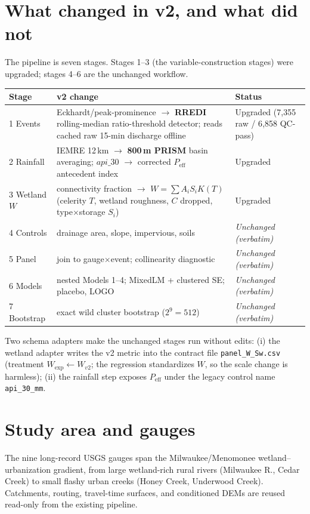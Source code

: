 \documentclass[11pt]{article}
\begin{document}
\section{What changed in v2, and what did not}
The pipeline is seven stages. Stages 1--3 (the variable-construction stages) were upgraded;
stages 4--6 are the unchanged workflow.
\begin{table}[htbp]\centering\small
\begin{tabular}{p{1.2cm}p{6.6cm}p{6.0cm}}
\toprule
Stage & v2 change & Status \\
\midrule
1 Events & Eckhardt/peak-prominence $\rightarrow$ \textbf{RREDI} rolling-median ratio-threshold
detector; reads cached raw 15-min discharge offline & Upgraded (7{,}355 raw / 6{,}858 QC-pass) \\
2 Rainfall & IEMRE 12\,km $\rightarrow$ \textbf{800\,m PRISM} basin averaging; $api\_30$
$\rightarrow$ corrected $P_{\text{eff}}$ antecedent index & Upgraded \\
3 Wetland $W$ & connectivity fraction $\rightarrow$ \textbf{$W=\sum A_iS_iK(T)$} (celerity $T$,
wetland roughness, $C$ dropped, type$\times$storage $S_i$) & Upgraded \\
4 Controls & drainage area, slope, impervious, soils & \emph{Unchanged (verbatim)} \\
5 Panel & join to gauge$\times$event; collinearity diagnostic & \emph{Unchanged (verbatim)} \\
6 Models & nested Models 1--4; MixedLM + clustered SE; placebo, LOGO & \emph{Unchanged (verbatim)} \\
7 Bootstrap & exact wild cluster bootstrap ($2^9=512$) & \emph{Unchanged (verbatim)} \\
\bottomrule
\end{tabular}
\end{table}

\noindent Two schema adapters make the unchanged stages run without edits: (i) the wetland
adapter writes the v2 metric into the contract file \texttt{panel\_W\_Sw.csv} (treatment
$W_{\exp}\!\leftarrow\!W_{v2}$; the regression standardizes $W$, so the scale change is harmless);
(ii) the rainfall step exposes $P_{\text{eff}}$ under the legacy control name \texttt{api\_30\_mm}.

\section{Study area and gauges}
The nine long-record USGS gauges span the Milwaukee/Menomonee wetland--urbanization gradient,
from large wetland-rich rural rivers (Milwaukee R., Cedar Creek) to small flashy urban creeks
(Honey Creek, Underwood Creek). Catchments, routing, travel-time surfaces, and conditioned DEMs
are reused read-only from the existing pipeline.
\end{document}
